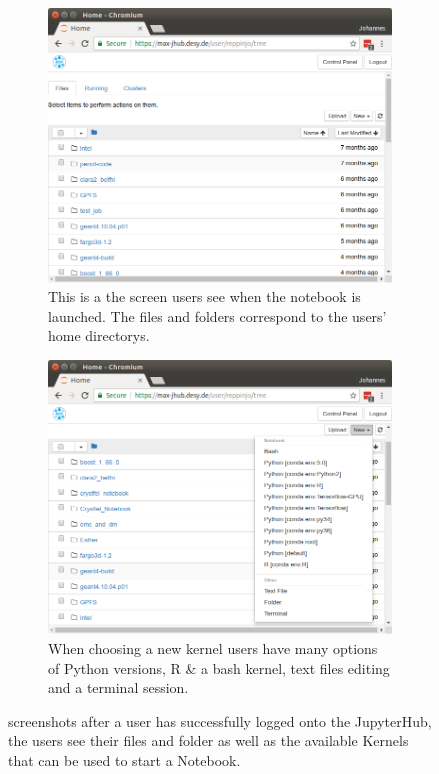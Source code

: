 \documentclass[10pt]{scrartcl}
\begin{document}
\begin{figure}
  \centering
    \begin{subfigure}{0.45\textwidth} %
	  \includegraphics[width=\textwidth]{figures/jhub006.png}
	  \caption{This is a the screen users see when the notebook is launched. The files and folders correspond to the users' home directorys.} %
  \end{subfigure}
  \vspace{1em} %
  \begin{subfigure}{0.45\textwidth} %
	  \includegraphics[width=\textwidth]{figures/jhub007.png}
	  \caption{When choosing a new kernel users have many options of Python versions, R \& a bash kernel, text files editing and a terminal session.} %
  \end{subfigure}
  \caption{screenshots after a user has successfully logged onto the JupyterHub, the users see their files and folder as well as the available Kernels that can be used to start a Notebook.}
  \label{fig:jhub_work}
\end{figure}
\end{document}
